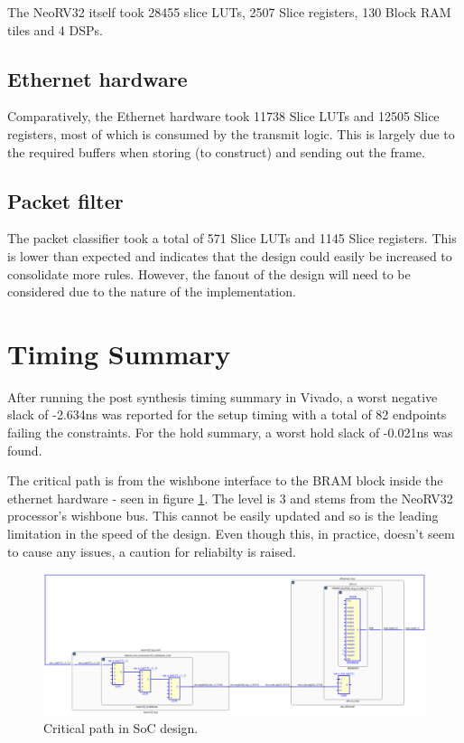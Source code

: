 The NeoRV32 itself took 28455 slice LUTs, 2507 Slice registers, 130 Block RAM tiles and 4 DSPs. 


\subsection{Ethernet hardware}
Comparatively, the Ethernet hardware took 11738 Slice LUTs and 12505 Slice registers, most of which is consumed by the transmit logic. This is largely due to the required buffers when storing (to construct) and sending out the frame. 

\subsection{Packet filter}
The packet classifier took a total of 571 Slice LUTs and 1145 Slice registers. This is lower than expected and indicates that the design could easily be increased to consolidate more rules. However, the fanout of the design will need to be considered due to the nature of the implementation. 





\section{Timing Summary}
\label{sec:timing_summary}
After running the post synthesis timing summary in Vivado, a worst negative slack of -2.634ns was reported for the setup timing with a total of 82 endpoints failing the constraints. For the hold summary, a worst hold slack of -0.021ns was found. 

The critical path is from the wishbone interface to the BRAM block inside the ethernet hardware - seen in figure \ref{fig:crit_path}. The level is 3 and stems from the NeoRV32 processor's wishbone bus. This cannot be easily updated and so is the leading limitation in the speed of the design. Even though this, in practice, doesn't seem to cause any issues, a caution for reliabilty is raised. 

\begin{figure}[h]
    \centering
    \includegraphics[width=1\textwidth]{Images/critical_path_delay_schematic.png}
    \caption[Critical path in SoC design]{Critical path in SoC design.}
    \label{fig:crit_path}
\end{figure}





